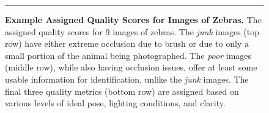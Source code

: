 \begin{figure}[!htb]
    \hrule
    \vspace{0.1cm}
    \vspace{0.1cm}
    \caption[Example Assigned Quality Scores for Images of Zebras]{\textbf{Example Assigned Quality Scores for Images of Zebras.}  The assigned quality scores for 9 images of zebras.  The \textit{junk} images (top row) have either extreme occlusion due to brush or due to only a small portion of the animal being photographed.  The \textit{poor} images (middle row), while also having occlusion issues, offer at least some usable information for identification, unlike the \textit{junk} images.  The final three quality metrics (bottom row) are assigned based on various levels of ideal pose, lighting conditions, and clarity.}
        \label{fig:qualities}
\end{figure}

